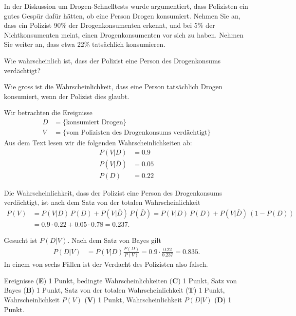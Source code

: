 In der Diskussion um Drogen-Schnelltests wurde argumentiert, dass
Polizisten ein gutes Gespür dafür hätten, ob eine Person Drogen
konsumiert.
Nehmen Sie an, dass ein Polizist 90\% der Drogenkonsumenten erkennt,
und bei 5\% der Nichtkonsumenten meint, einen Drogenkonsumenten vor sich
zu haben.
Nehmen Sie weiter an, dass etwa 22\% tatsächlich konsumieren.
\begin{teilaufgaben}
\item
Wie wahrscheinlich ist, dass der Polizist eine Person des Drogenkonsums
verdächtigt?
\item
Wie gross ist die Wahrscheinlichkeit, dass eine Person tatsächlich Drogen
konsumiert, wenn der Polizist dies glaubt.
\end{teilaufgaben}


\begin{loesung}
Wir betrachten die Ereignisse 
\begin{align*}
D&=\{\text{konsumiert Drogen}\}
\\
V&=\{\text{vom Polizisten des Drogenkonsums verdächtigt}\}
\end{align*}
Aus dem Text lesen wir die folgenden Wahrscheinlichkeiten ab:
\begin{align*}
P(V|D)
&=
0.9
\\
P(V|\overline{D})
&=
0.05
\\
P(D)
&=
0.22
\end{align*}
\begin{teilaufgaben}
\item
Die Wahrscheinlichkeit, dass der Polizist eine Person des Drogenkonsums
verdächtigt, ist nach dem Satz von der totalen Wahrscheinlichkeit
\begin{align*}
P(V)
&=
P(V|D)\,P(D) + P(V|\overline{D})\,P(\overline{D})
=
P(V|D)\,P(D) + P(V|\overline{D})\,(1-P(D))
\\
&=
0.9\cdot 0.22 + 0.05\cdot 0.78
=
0.237.
\end{align*}
\item
Gesucht ist $P(D|V)$.
Nach dem Satz von Bayes gilt
\begin{align*}
P(D|V)
&=
P(V|D)\frac{P(D)}{P(V)}
=
0.9\cdot\frac{0.22}{0.237}
=
0.835.
\end{align*}
In einem von sechs Fällen ist der Verdacht des Polizisten also falsch.
\qedhere
\end{teilaufgaben}
\end{loesung}

\begin{bewertung}
Ereignisse ({\bf E}) 1 Punkt,
bedingte Wahrscheinlichkeiten ({\bf C}) 1 Punkt,
Satz von Bayes ({\bf B}) 1 Punkt,
Satz von der totalen Wahrscheinlichkeit ({\bf T}) 1 Punkt,
Wahrscheinlichkeit $P(V)$ ({\bf V}) 1 Punkt,
Wahrscheinlichkeit $P(D|V)$ ({\bf D}) 1 Punkt.
\end{bewertung}


